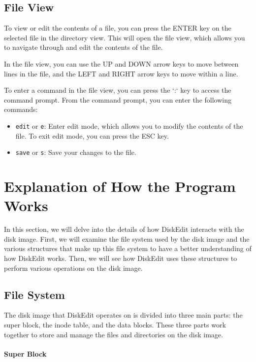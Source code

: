 \documentclass{article}
\begin{document}
\subsection{File View}

To view or edit the contents of a file, you can press the ENTER key on the selected file in the directory view. This will open the file view, which allows you to navigate through and edit the contents of the file.

In the file view, you can use the UP and DOWN arrow keys to move between lines in the file, and the LEFT and RIGHT arrow keys to move within a line.

To enter a command in the file view, you can press the `:` key to access the command prompt. From the command prompt, you can enter the following commands:

\begin{itemize}
    \item \texttt{edit} or \texttt{e}: Enter edit mode, which allows you to modify the contents of the file. To exit edit mode, you can press the ESC key.
    \item \texttt{save} or \texttt{s}: Save your changes to the file.
\end{itemize}

\section{Explanation of How the Program Works}

In this section, we will delve into the details of how DiskEdit interacts with the disk image. First, we will examine the file system used by the disk image and the various structures that make up this file system to have a better understanding of how DiskEdit works. Then, we will see how DiskEdit uses these structures to perform various operations on the disk image.

\subsection{File System}

The disk image that DiskEdit operates on is divided into three main parts: the super block, the inode table, and the data blocks. These three parts work together to store and manage the files and directories on the disk image.

\paragraph{Super Block}
\end{document}
